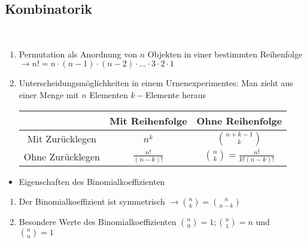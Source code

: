 \documentclass[a4paper,twocolumn,10pt]{onepgnote1}
\begin{document}
\subsection{Kombinatorik}\\
\begin{enumerate}
    \item Permutation als  Anordnung von $n$ Objekten in einer bestimmten Reihenfolge $\longrightarrow n! = n\cdot ( n-1) \cdot (n-2)\cdot \ldots \cdot 3\cdot  2\cdot 1$\\
    \item Unterscheidungsmöglichkeiten in einem Urnenexperimentes: Man zieht aus einer Menge mit $n$ Elementen $k-$Elemente heraus\\
    \begin{tabular}{|c||c|c|}
    \hline
         &  Mit Reihenfolge & Ohne Reihenfolge\\
           \hline\hline
     Mit Zurücklegen   & $n^k$ & $\binom{n+k-1}{k}$\\
     \hline
     Ohne Zurücklegen & $\frac{n!}{\left(n-k\right)!}$& $\binom{n}{k} = \frac{n!}{k!\left(n-k\right)!}$\\
     \hline
    \end{tabular} 
\end{enumerate}
\begin{itemize}
\item Eigenschaften des Binomialkoeffizienten
\end{itemize}
\begin{enumerate}
    \item Der Binomialkoeffizient ist symmetrisch $\longrightarrow \binom{n}{k} = \binom{n}{n-k}$\\
    \item Besondere Werte des Binomialkoeffizienten $\binom{n}{0}= 1; \binom{n}{1} = n$ und $\binom{n}{n}=1$
\end{enumerate}
\newpage
\end{document}
